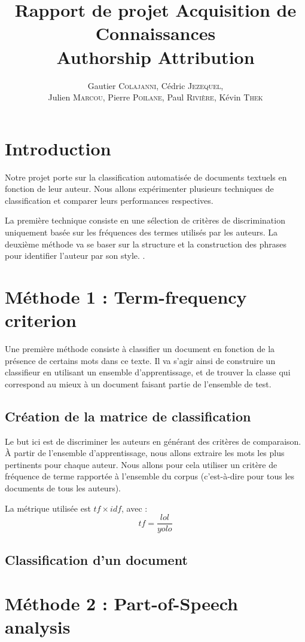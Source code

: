 \documentclass[a4paper]{article}
\author{Gautier \textsc{Colajanni}, Cédric \textsc{Jezequel},\\ Julien \textsc{Marcou}, Pierre \textsc{Poilane}, Paul \textsc{Rivière}, Kévin \textsc{Thek}}
\title{Rapport de projet Acquisition de Connaissances \\ Authorship Attribution}
\begin{document}
\maketitle

\section{Introduction}
Notre projet porte sur la classification automatisée de documents textuels en fonction de leur auteur. Nous allons expérimenter plusieurs techniques de classification et comparer leurs performances respectives.

La première technique consiste en une sélection de critères de discrimination uniquement basée sur les fréquences des termes utilisés par les auteurs. La deuxième méthode va se baser sur la structure et la construction des phrases pour identifier l'auteur par son style. .

\section{Méthode 1 : Term-frequency criterion}
Une première méthode consiste à classifier un document en fonction de la présence de certains mots dans ce texte. Il va s'agir ainsi de construire un classifieur en utilisant un ensemble d'apprentissage, et de trouver la classe qui correspond au mieux à un document faisant partie de l'ensemble de test.

\subsection{Création de la matrice de classification}
Le but ici est de discriminer les auteurs en générant des critères de comparaison. À partir de l'ensemble d'apprentissage, nous allons extraire les mots les plus pertinents pour chaque auteur. Nous allons pour cela utiliser un critère de fréquence de terme rapportée à l'ensemble du corpus (c'est-à-dire pour tous les documents de tous les auteurs).

La métrique utilisée est $tf \times idf$, avec : \[tf = \frac{lol}{yolo}\]

\subsection{Classification d'un document}

\section{Méthode 2 : Part-of-Speech analysis}
\end{document}
